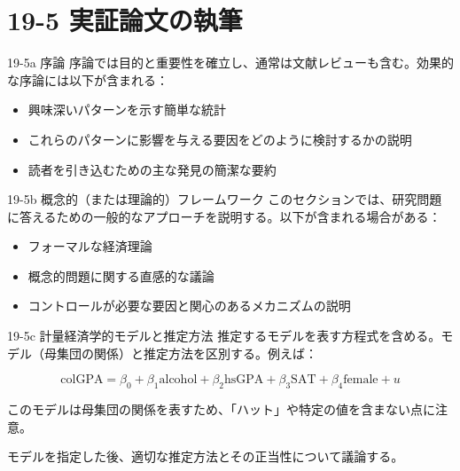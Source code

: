 \documentclass[
  ignorenonframetext,
]{beamer}
\providecommand{\tightlist}{%
  \setlength{\itemsep}{0pt}\setlength{\parskip}{0pt}}
\begin{document}
\section{19-5
実証論文の執筆}\label{ux5b9fux8a3cux8ad6ux6587ux306eux57f7ux7b46}

\begin{frame}{19-5a 序論}
\label{a-ux5e8fux8ad6}
序論では目的と重要性を確立し、通常は文献レビューも含む。効果的な序論には以下が含まれる：

\begin{itemize}
\tightlist
\item
  興味深いパターンを示す簡単な統計
\item
  これらのパターンに影響を与える要因をどのように検討するかの説明
\item
  読者を引き込むための主な発見の簡潔な要約
\end{itemize}
\end{frame}

\begin{frame}{19-5b 概念的（または理論的）フレームワーク}
\label{b-ux6982ux5ff5ux7684ux307eux305fux306fux7406ux8ad6ux7684ux30d5ux30ecux30fcux30e0ux30efux30fcux30af}
このセクションでは、研究問題に答えるための一般的なアプローチを説明する。以下が含まれる場合がある：

\begin{itemize}
\tightlist
\item
  フォーマルな経済理論
\item
  概念的問題に関する直感的な議論
\item
  コントロールが必要な要因と関心のあるメカニズムの説明
\end{itemize}
\end{frame}

\begin{frame}{19-5c 計量経済学的モデルと推定方法}
\label{c-ux8a08ux91cfux7d4cux6e08ux5b66ux7684ux30e2ux30c7ux30ebux3068ux63a8ux5b9aux65b9ux6cd5}
推定するモデルを表す方程式を含める。モデル（母集団の関係）と推定方法を区別する。例えば：

\[
\text{colGPA} = \beta_0 + \beta_1\text{alcohol} + \beta_2\text{hsGPA} + \beta_3\text{SAT} + \beta_4\text{female} + u
\]

このモデルは母集団の関係を表すため、「ハット」や特定の値を含まない点に注意。

モデルを指定した後、適切な推定方法とその正当性について議論する。
\end{frame}
\end{document}
